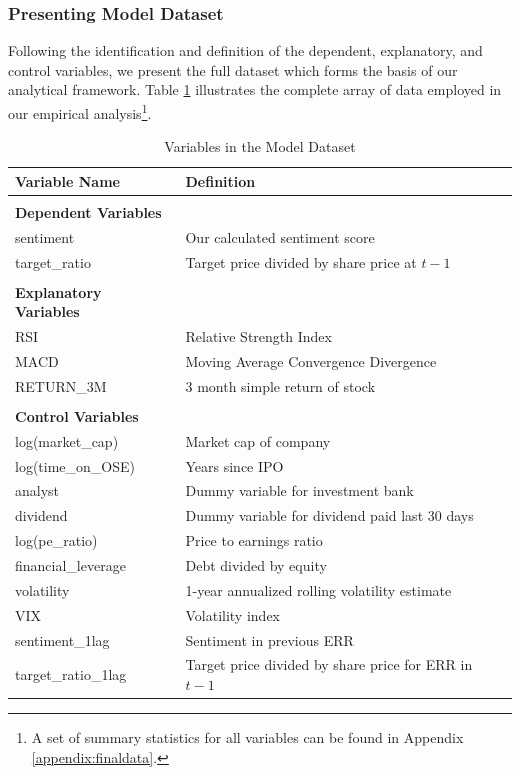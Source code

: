 \subsubsection{Presenting Model Dataset}


Following the identification and definition of the dependent, explanatory, and control variables, we present the full dataset which forms the basis of our analytical framework. Table \ref{tab:fulldataset} illustrates the complete array of data employed in our empirical analysis\footnote{A set of summary statistics for all variables can be found in Appendix \ref{appendix:finaldata}.}.


\begin{table}[H]
    \centering
    \begin{tabularx}{\textwidth}{ll}
    \toprule
       \textbf{Variable Name}  & \textbf{Definition} \\ \hline \\
       \textbf{Dependent Variables} & \\ \hline
       sentiment & Our calculated sentiment score \\
       target\_ratio & Target price divided by share price at \(t-1\) \\ \\
       \textbf{Explanatory Variables} & \\ \hline
       RSI & Relative Strength Index \\
       MACD & Moving Average Convergence Divergence \\
       RETURN\_3M & 3 month simple return of stock  \\ \\
       \textbf{Control Variables} & \\ \hline log(market\_cap) & Market cap of company \\
       log(time\_on\_OSE) & Years since IPO \\
       analyst & Dummy variable for investment bank \\
       dividend & Dummy variable for dividend paid last 30 days \\ 
       log(pe\_ratio) & Price to earnings ratio \\
       financial\_leverage & Debt divided by equity \\
       volatility & 1-year annualized rolling volatility estimate \\ 
       VIX & Volatility index \\ 
       sentiment\_1lag & Sentiment in previous ERR \\ 
       target\_ratio\_1lag & Target price divided by share price for ERR in \(t-1\)
       \\ \bottomrule
    \end{tabularx}
    \caption{Variables in the Model Dataset}
    \label{tab:fulldataset}
\end{table}

